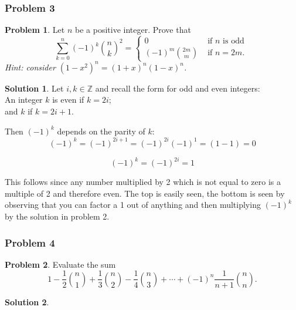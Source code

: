 \documentclass[10pt,a4paper,titlepage,twoside,draft]{article}
\theoremstyle{plain}
\theoremstyle{definition}
\newtheorem*{prob}{Problem}
\newtheorem*{sol}{Solution}
\theoremstyle{remark}
\begin{document}
\subsubsection{Problem 3}

\begin{prob}
Let $n$ be a positive integer. Prove that
\[ \sum_{k=0}^n(-1)^k\binom{n}{k}^2 =  \begin{cases}  0 & \text{ if } n \text{ is odd } \\ 
(-1)^m\binom{2m}{m} & \text{ if } n=2m. \end{cases}  \]
\emph{Hint: consider $(1-x^2)^n = (1+x)^n(1-x)^n$.}
\end{prob}

\medskip

\begin{sol}
Let $i,k \in \mathbb{Z}$ and recall the form for odd and even integers: \\

An integer $k$ is even if $k = 2i$; \\
and $k$ if $k = 2i + 1$.

Then $(-1)^{k}$ depends on the parity of $k$: \\

\[(-1)^{k} = (-1)^{2i + 1} = (-1)^{2i}(-1)^{1} = (1-1) = 0\]

\[(-1)^{k} = (-1)^{2i} = 1\]

This follows since any number multiplied by 2 which is not equal to zero is a multiple of 2 and therefore even. The top is easily seen, the bottom is seen by observing that you can factor a 1 out of anything and then multiplying $(-1)^{k}$ by the solution in problem 2.

\end{sol}

\subsubsection{Problem 4}

\begin{prob}
Evaluate the sum
\[ 1 - \frac{1}{2}\binom{n}{1} + \frac{1}{3}\binom{n}{2} - \frac{1}{4}\binom{n}{3} + \cdots + (-1)^n \frac{1}{n+1}\binom{n}{n}.\]
\end{prob}

\medskip

\begin{sol}

\end{sol}
\end{document}
